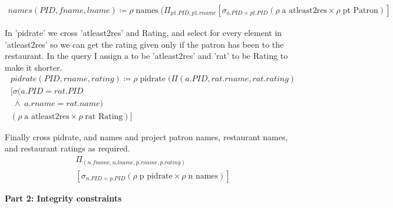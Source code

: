 \documentclass{article}
\begin{document}
\begin{enumerate}
		\begin{align}
         names(PID,fname,lname) \coloneqq \rho \; \text{names} \;(\Pi_{p1.PID, p1.rname} [\sigma_{a.PID = pt.PID} (\rho \; \text{a atleast2res} \times \rho \; \text{pt Patron})]          
		\end{align}
		
		In 'pidrate' we cross 'atleast2res' and Rating, and select for every element in 'atleast2res' so we can get the rating given only if the patron has been to the restaurant. In the query I assign a to be 'atleast2res' and 'rat' to be Rating to make it shorter.
		\begin{align}
          pidrate(PID,rname,rating)\coloneqq \rho \; \text{pidrate} \;(\Pi(a.PID, rat.rname, rat.rating)\\	[\sigma(a.PID = rat.PID \\ \; \wedge \; a.rname = rat.name) \\ (\rho \; \text{a atleast2res} \times \rho \; \text{rat Rating})]          
		\end{align}
		
		Finally cross pidrate, and names and project patron names, restaurant names, and restaurant ratings  as required.
		\begin{align}
               \Pi_{(n.fname, n.lname, p.rname, p.rating)} \\ [\sigma_{n.PID = p.PID} (\rho \; \text{p pidrate} \times \rho \; \text{n names})]  
		\end{align}

\end{enumerate}

\begin{LARGE}
\textbf{Part 2: Integrity constraints}
\end{LARGE}
\end{document}
